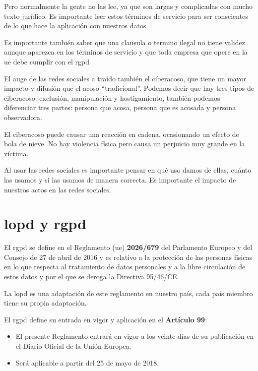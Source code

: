 Pero normalmente la gente no las lee, ya que son largas y complicadas con mucho texto jurídico. Es importante leer estos términos de servicio para ser conscientes de lo que hace la aplicación con nuestros datos.

Es importante también saber que una clausula o termino ilegal no tiene validez aunque aparezca en los términos de servicio y que toda empresa que opere en la \gls{ue} debe cumplir con el \gls{rgpd}

El auge de las redes sociales a traído también el ciberacoso, que tiene un mayor impacto y difusión que el acoso ``tradicional''. Podemos decir que hay tres tipos de ciberacoso: exclusión, manipulación y hostigamiento, también podemos diferenciar tres partes: persona que acosa, persona que es acosada y persona observadora.

El ciberacoso puede causar una reacción en cadena, ocasionando un efecto de bola de nieve. No hay violencia física pero causa un perjuicio muy grande en la víctima.

Al usar las redes sociales es importante pensar en qué uso damos de ellas, cuánto las usamos y si las usamos de manera correcta. Es importante el impacto de nuestros actos en las redes sociales.
\section{\gls{lopd} y \gls{rgpd}}

El \gls{rgpd} se define en el Reglamento (\gls{ue}) \textbf{2026/679} del Parlamento Europeo y del Consejo de 27 de abril de 2016 y es relativo a la protección de las personas físicas en lo que respecta al tratamiento de datos personales y a la libre circulación de estos datos y por el que se deroga la Directiva 95/46/CE.

La \gls{lopd} es una adaptación de este reglamento en nuestro país, cada país miembro tiene su propia adaptación.


El \gls{rgpd} define su entrada en vigor y aplicación en el \textbf{Artículo 99}:
\begin{itemize}
    \item El presente Reglamento entrará en vigor a los veinte días de su publicación en el Diario Oficial de la Unión Europea.
    \item Será aplicable a partir del 25 de mayo de 2018.
\end{itemize}

